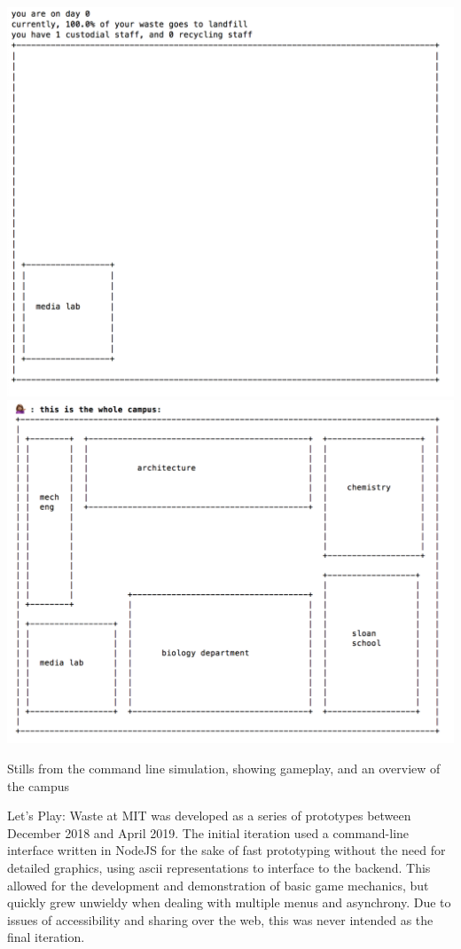 \documentclass[nofonts,nols,justified,nobib]{tufte-book}
\begin{document}
\begin{marginfigure}
\includegraphics[width=\textwidth]{img/3/prototyping/early-day.png}
\includegraphics[width=\textwidth]{img/3/prototyping/early-map.png}
\caption{Stills from the command line simulation, showing gameplay, and an overview of the campus }
\end{marginfigure}


Let's Play: Waste at MIT was developed as a series of prototypes between December 2018 and April 2019. The initial iteration used a command-line interface written in NodeJS for the sake of fast prototyping without the need for detailed graphics, using ascii representations to interface to the backend. This allowed for the development and demonstration of basic game mechanics, but quickly grew unwieldy when dealing with multiple menus and asynchrony. Due to issues of accessibility and sharing over the web, this was never intended as the final iteration.
\end{document}
